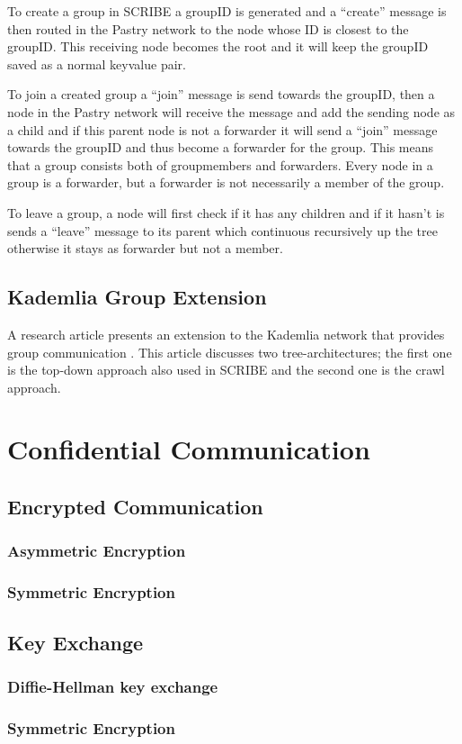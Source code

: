 To create a group in SCRIBE a groupID is generated and a ``create'' message is then routed in the Pastry network to the node whose ID is closest to the groupID. This receiving node becomes the root and it will keep the groupID saved as a normal keyvalue pair.

To join a created group a ``join'' message is send towards the groupID, then a node in the Pastry network will receive the message and add the sending node as a child and if this parent node is not a forwarder it will send a ``join'' message towards the groupID and thus become a forwarder for the group. This means that a group consists both of groupmembers and forwarders. Every node in a group is a forwarder, but a forwarder is not necessarily a member of  the group. 

To leave a group, a node will first check if it has any children and if it hasn't is sends a ``leave'' message to its parent which continuous recursively up the tree otherwise it stays as forwarder but not a member.

 
\subsection{Kademlia Group Extension}
A research article presents an extension to the Kademlia network that provides group communication \cite{groKdml}.  This article discusses two tree-architectures; the first one is the top-down approach also used in SCRIBE and the second one is the crawl approach.


\section{Confidential Communication}
\subsection{Encrypted Communication}
\subsubsection{Asymmetric Encryption}
\subsubsection{Symmetric Encryption}

\subsection{Key Exchange}
\subsubsection{Diffie-Hellman key exchange}
\subsubsection{Symmetric Encryption}






